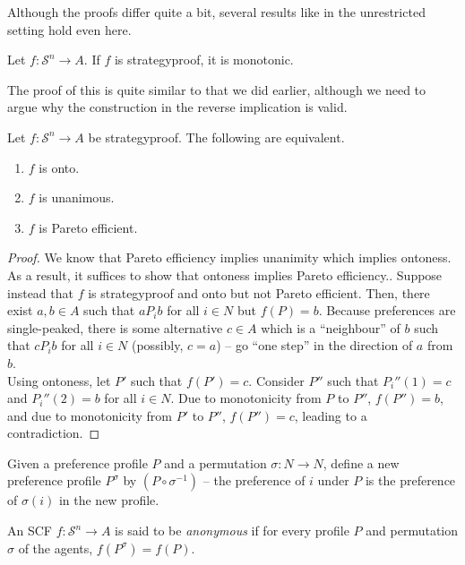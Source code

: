 		Although the proofs differ quite a bit, several results like in the unrestricted setting hold even here.

		\begin{ftheo}
			Let $f : \mathcal{S}^n \to A$. If $f$ is strategyproof, it is monotonic.
		\end{ftheo}
		The proof of this is quite similar to that we did earlier, although we need to argue why the construction in the reverse implication is valid.

		\begin{ftheo}
			\label{theo: single-peaked equivalence}
			Let $f : \mathcal{S}^n \to A$ be strategyproof. The following are equivalent.
			\begin{enumerate}
				\item $f$ is onto.
				\item $f$ is unanimous.
				\item $f$ is Pareto efficient.
			\end{enumerate}
		\end{ftheo}

		\begin{proof}
			We know that Pareto efficiency implies unanimity which implies ontoness. As a result, it suffices to show that ontoness implies Pareto efficiency.. Suppose instead that $f$ is strategyproof and onto but not Pareto efficient. Then, there exist $a,b \in A$ such that $a P_i b$ for all $i \in N$ but $f(P) = b$. Because preferences are single-peaked, there is some alternative $c \in A$ which is a ``neighbour'' of $b$ such that $c P_i b$ for all $i \in N$ (possibly, $c = a$) -- go ``one step'' in the direction of $a$ from $b$.\\
			Using ontoness, let $P'$ such that $f(P') = c$. Consider $P''$ such that $P_i''(1) = c$ and $P_i''(2) = b$ for all $i \in N$. Due to monotonicity from $P$ to $P''$, $f(P'') = b$, and due to monotonicity from $P'$ to $P''$, $f(P'') = c$, leading to a contradiction.
		\end{proof}

		\begin{fdef}
			Given a preference profile $P$ and a permutation $\sigma : N \to N$, define a new preference profile $P^\sigma$ by $(P \circ \sigma^{-1})$ -- the preference of $i$ under $P$ is the preference of $\sigma(i)$ in the new profile.
		\end{fdef}

		\begin{fdef}[Anonymity]
			An SCF $f : \mathcal{S}^n \to A$ is said to be \emph{anonymous} if for every profile $P$ and permutation $\sigma$ of the agents, $f(P^\sigma) = f(P)$.
		\end{fdef}

